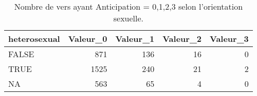 \begin{table}[H]

\caption{Nombre de vers ayant Anticipation = 0,1,2,3 selon l'orientation sexuelle.}
\centering
\begin{tabular}[t]{lrrrr}
\toprule
heterosexual & Valeur\_0 & Valeur\_1 & Valeur\_2 & Valeur\_3\\
\midrule
FALSE & 871 & 136 & 16 & 0\\
TRUE & 1525 & 240 & 21 & 2\\
NA & 563 & 65 & 4 & 0\\
\bottomrule
\end{tabular}
\end{table}